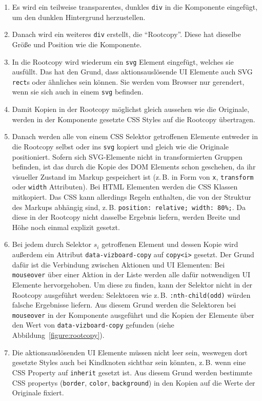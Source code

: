 \documentclass[
	headsepline,
	footsepline,
	fontsize=12pt,
	bibliography=totoc
]{scrbook}
\begin{document}
\begin{enumerate}
	\item Es wird ein teilweise transparentes, dunkles \texttt{div} in die Komponente eingefügt, um den dunklen Hintergrund herzustellen.
	\item Danach wird ein weiteres \texttt{div} erstellt, die \enquote{Rootcopy}. Diese hat dieselbe Größe und Position wie die Komponente.
	\item In die Rootcopy wird wiederum ein \texttt{svg} Element eingefügt, welches sie ausfüllt. Das hat den Grund, dass aktionsauslösende UI Elemente auch SVG \texttt{rect}s oder ähnliches sein können. Sie werden vom Browser nur gerendert, wenn sie sich auch in einem \texttt{svg} befinden.
	\item Damit Kopien in der Rootcopy möglichst gleich aussehen wie die Originale, werden in der Komponente gesetzte CSS Styles auf die Rootcopy übertragen.
	\item Danach werden alle von einem CSS Selektor getroffenen Elemente entweder in die Rootcopy selbst oder ins \texttt{svg} kopiert und gleich wie die Originale positioniert. Sofern sich SVG-Elemente nicht in transformierten Gruppen befinden, ist das durch die Kopie des DOM Elements schon geschehen, da ihr visueller Zustand im Markup gespeichert ist (z.\,B. in Form von \texttt{x}, \texttt{transform} oder \texttt{width} Attributen). Bei HTML Elementen werden die CSS Klassen mitkopiert. Das CSS kann allerdings Regeln enthalten, die von der Struktur des Markups abhängig sind, z.\,B. \texttt{position: relative; width: 80\%;}. Da diese in der Rootcopy nicht dasselbe Ergebnis liefern, werden Breite und Höhe noch einmal explizit gesetzt.
	\item Bei jedem durch Selektor $s_i$ getroffenen Element und dessen Kopie wird außerdem ein Attribut \texttt{data-vizboard-copy} auf \texttt{copy<i>} gesetzt. Der Grund dafür ist die Verbindung zwischen Aktionen und UI Elementen: Bei \texttt{mouseover} über einer Aktion in der Liste werden alle dafür notwendigen UI Elemente hervorgehoben. Um diese zu finden, kann der Selektor nicht in der Rootcopy ausgeführt werden: Selektoren wie z.\,B. \texttt{:nth-child(odd)} würden falsche Ergebnisse liefern. Aus diesem Grund werden die Selektoren bei \texttt{mouseover} in der Komponente ausgeführt und die Kopien der Elemente über den Wert von \texttt{data-vizboard-copy} gefunden (siehe Abbildung~\ref{figure:rootcopy}).
	\item Die aktionsauslösenden UI Elemente müssen nicht leer sein, weswegen dort gesetzte Styles auch bei Kindknoten sichtbar sein könnten, z.\,B. wenn eine CSS Property auf \texttt{inherit} gesetzt ist. Aus diesem Grund werden bestimmte CSS propertys (\texttt{border}, \texttt{color}, \texttt{background}) in den Kopien auf die Werte der Originale fixiert.

\end{enumerate}
\end{document}
